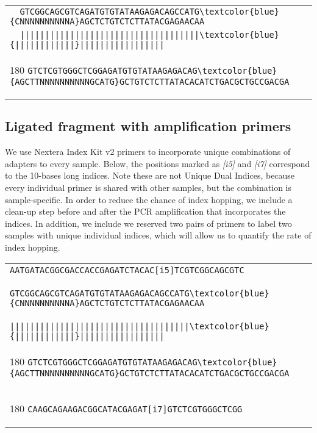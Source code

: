 \documentclass[a4paper,12pt]{article}
\begin{document}
\begin{flushleft}
\begin{tabular}{l}
\Verb+  GTCGGCAGCGTCAGATGTGTATAAGAGACAGCCATG\textcolor{blue}{CNNNNNNNNNNA}AGCTCTGTCTCTTATACGAGAACAA+\\[-6pt]
\Verb+  ||||||||||||||||||||||||||||||||||||\textcolor{blue}{||||||||||||}|||||||||||||||||+\\[-10pt]
   \begin{turn}{180}
   \Verb+GTCTCGTGGGCTCGGAGATGTGTATAAGAGACAG\textcolor{blue}{AGCTTNNNNNNNNNNGCATG}GCTGTCTCTTATACACATCTGACGCTGCCGACGA+
   \end{turn}
\\
\end{tabular}
\vspace*{0.3cm}

\subsection*{Ligated fragment with amplification primers}
We use Nextera Index Kit v2 primers to incorporate unique combinations of adapters to every sample. Below, the positions marked as \emph{[i5]} and \emph{[i7]} correspond to the 10-bases long indices. Note these are not Unique Dual Indices, because every individual primer is shared with other samples, but the combination is sample-specific. In order to reduce the chance of index hopping, we include a clean-up step before and after the PCR amplification that incorporates the indices. In addition, we include we reserved two pairs of primers to label two samples with unique individual indices, which will allow us to quantify the rate of index hopping.

\begin{tabular}{l}
\Verb+AATGATACGGCGACCACCGAGATCTACAC[i5]TCGTCGGCAGCGTC+\\[-8pt]
\Verb+                                   GTCGGCAGCGTCAGATGTGTATAAGAGACAGCCATG\textcolor{blue}{CNNNNNNNNNNA}AGCTCTGTCTCTTATACGAGAACAA+\\[-6pt]
\Verb+                                   ||||||||||||||||||||||||||||||||||||\textcolor{blue}{||||||||||||}|||||||||||||||||+\\[-10pt]
   \begin{turn}{180}
   \Verb+GTCTCGTGGGCTCGGAGATGTGTATAAGAGACAG\textcolor{blue}{AGCTTNNNNNNNNNNGCATG}GCTGTCTCTTATACACATCTGACGCTGCCGACGA                                 +
   \end{turn}
\\[-8pt]
   \begin{turn}{180}
   \Verb+CAAGCAGAAGACGGCATACGAGAT[i7]GTCTCGTGGGCTCGG                                                                                                          +
   \end{turn}
\\
\end{tabular}
\vspace*{0.3cm}


\end{flushleft}
\end{document}
